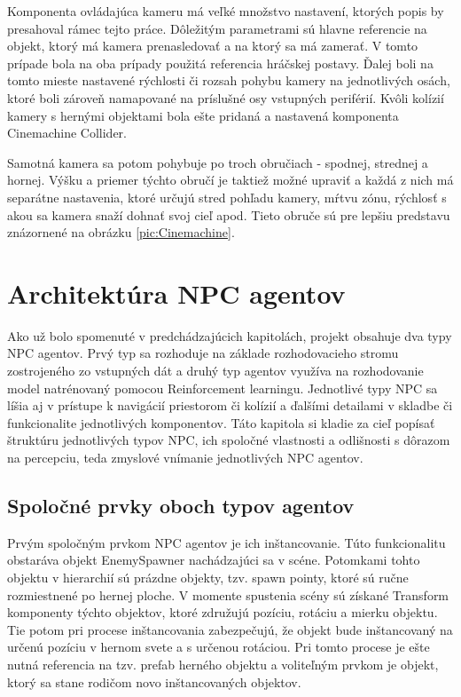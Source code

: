 \documentclass[slovak, master]{diploma}
\begin{document}
Komponenta ovládajúca kameru má veľké množstvo nastavení, ktorých popis by presahoval rámec tejto práce. Dôležitým parametrami sú hlavne referencie na objekt, ktorý má kamera prenasledovať a na ktorý sa má zamerať. V tomto prípade bola na oba prípady použitá referencia hráčskej postavy. Ďalej boli na tomto mieste nastavené rýchlosti či rozsah pohybu kamery na jednotlivých osách, ktoré boli zároveň namapované na príslušné osy vstupných periférií. Kvôli kolízií kamery s hernými objektami bola ešte pridaná a nastavená komponenta Cinemachine Collider.

Samotná kamera sa potom pohybuje po troch obručiach - spodnej, strednej a hornej. Výšku a priemer týchto obručí je taktiež možné upraviť a každá z nich má separátne nastavenia, ktoré určujú stred pohľadu kamery, mŕtvu zónu, rýchlosť s akou sa kamera snaží dohnať svoj cieľ apod. Tieto obruče sú pre lepšiu predstavu znázornené na obrázku \ref{pic:Cinemachine}.

\chapter{Architektúra NPC agentov}
\label{sec:Agents}
Ako už bolo spomenuté v predchádzajúcich kapitolách, projekt obsahuje dva typy NPC agentov. Prvý typ sa rozhoduje na základe rozhodovacieho stromu zostrojeného zo vstupných dát a druhý typ agentov využíva na rozhodovanie model natrénovaný pomocou Reinforcement learningu. Jednotlivé typy NPC sa líšia aj v prístupe k navigácií priestorom či kolízií a ďalšími detailami v skladbe či funkcionalite jednotlivých komponentov. Táto kapitola si kladie za cieľ popísať štruktúru jednotlivých typov NPC, ich spoločné vlastnosti a odlišnosti s dôrazom na percepciu, teda zmyslové vnímanie jednotlivých NPC agentov.

\section{Spoločné prvky oboch typov agentov}
\label{sec:AgentsBoth}

Prvým spoločným prvkom NPC agentov je ich inštancovanie. Túto funkcionalitu obstaráva objekt EnemySpawner nachádzajúci sa v scéne. Potomkami tohto objektu v hierarchií sú prázdne objekty, tzv. spawn pointy, ktoré sú ručne rozmiestnené po hernej ploche. V momente spustenia scény sú získané Transform komponenty týchto objektov, ktoré združujú pozíciu, rotáciu a mierku objektu. Tie potom pri procese inštancovania zabezpečujú, že objekt bude inštancovaný na určenú pozíciu v hernom svete a s určenou rotáciou. Pri tomto procese je ešte nutná referencia na tzv. prefab herného objektu a voliteľným prvkom je objekt, ktorý sa stane rodičom novo inštancovaných objektov. 
\end{document}
